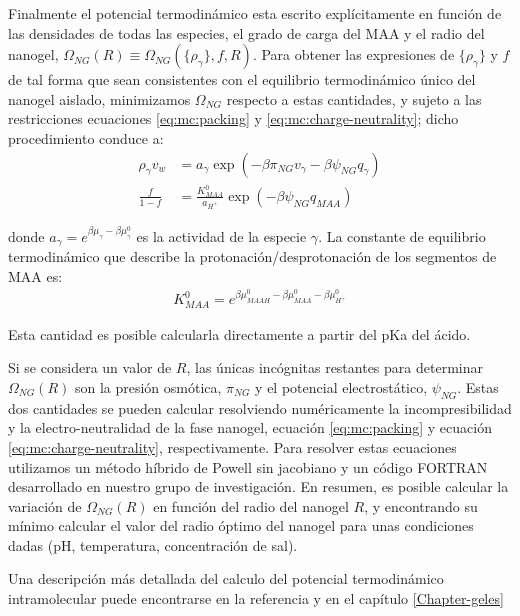 	
	Finalmente el potencial termodin\'amico esta escrito expl\'icitamente en funci\'on de las densidades de todas las especies, el grado de carga del MAA y el radio del nanogel, $\Omega_{NG}(R)\equiv\Omega_{NG}(\{\rho_\gamma\},f,R)$.
	Para obtener las expresiones de $\{\rho_\gamma\}$ y $f$ de tal forma que sean consistentes con el equilibrio termodin\'amico \'unico del nanogel aislado, minimizamos $\Omega_{NG}$ respecto a estas cantidades, y  sujeto a las restricciones ecuaciones  \ref{eq:mc:packing} y  \ref{eq:mc:charge-neutrality}; dicho procedimiento conduce a: 
	\begin{align}
		\rho_\gamma v_w &= a_\gamma \exp(-\beta\pi_{NG}v_\gamma -\beta\psi_{NG}q_{\gamma})\\
		\frac{f}{1-f}&= \frac{K^0_{MAA}}{a_{H^+}}\exp(-\beta\psi_{NG}q_{MAA})\label{eq:mc:fcharge}
	\end{align}
	
	\noindent donde $a_\gamma = e^{\beta\mu_\gamma-\beta\mu_\gamma^0}$ es la actividad de la especie $\gamma$. 
	La constante de equilibrio termodin\'amico que describe la protonaci\'on/desprotonaci\'on de los segmentos de MAA es:
	\begin{align}
		K^0_{MAA}= e^{\beta\mu^0_{MAAH}-\beta\mu^0_{MAA}-\beta\mu^0_{H^+}}
	\end{align}
	
	\noindent Esta cantidad es posible calcularla directamente a partir del pKa del \'acido.
	
	
	Si se considera  un valor de  $R$, las \'unicas inc\'ognitas restantes para determinar $\Omega_{NG}(R)$ son la presi\'on osm\'otica, $\pi_{NG}$ y el potencial electrost\'atico, $\psi_{NG}$.
	Estas dos cantidades se pueden calcular resolviendo num\'ericamente la incompresibilidad y la electro-neutralidad de la fase nanogel, ecuaci\'on \ref{eq:mc:packing} y ecuaci\'on \ref{eq:mc:charge-neutrality}, respectivamente.
	Para resolver estas ecuaciones utilizamos un m\'etodo h\'ibrido de Powell sin jacobiano y un c\'odigo FORTRAN desarrollado en nuestro grupo de investigaci\'on.
	En resumen, es posible calcular la variaci\'on de  $\Omega_{NG}(R)$ en funci\'on del radio del nanogel $R$, y encontrando su m\'inimo calcular el valor del radio \'optimo del nanogel para unas condiciones dadas (pH, temperatura, concentraci\'on de sal).
	
	Una descripci\'on m\'as detallada del calculo del potencial termodin\'amico intramolecular puede encontrarse en la referencia  \cite{perez2021thermodynamic} y en el cap\'itulo \ref{Chapter-geles}
	
